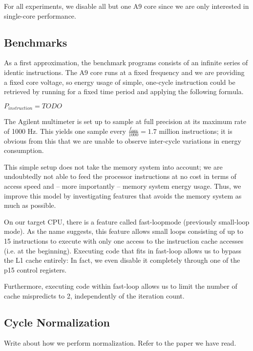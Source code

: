 For all experiments, we disable all but one A9 core since we are only interested
in single-core performance.


\subsection{Benchmarks}
As a first approximation, the benchmark programs consists of an infinite series
of identic instructions. The A9 core runs at a fixed frequency and we are
providing a fixed core voltage, so energy usage of simple, one-cycle instruction
could be retrieved by running for a fixed time period and applying the following
formula.

\begin{center}
$P_{instruction} = TODO$
\end{center}

The Agilent multimeter is set up to sample at full precision at its maximum rate
of 1000 Hz. This yields one sample every $\frac{ f_{core} }{ 1000 } = 1.7$
million instructions; it is obvious from this that we are unable to observe
inter-cycle variations in energy consumption.

This simple setup does not take the memory system into account; we are
undoubtedly not able to feed the processor instructions at no cost in terms of
access speed and -- more importantly -- memory system energy usage. Thus, we
improve this model by investigating features that avoids the memory system as
much as possible.

On our target CPU, there is a feature called fast-loop\texttrademark mode
(previously small-loop mode). As the name suggests, this feature allows small
loops consisting of up to 15 instructions to execute with only one access to the
instruction cache accesses (i.e. at the beginning). Executing code that fits in
fast-loop allows us to bypass the L1 cache entirely: In fact, we even disable it
completely through one of the p15 control registers.

Furthermore, executing code within fast-loop allows us to limit the number of
cache mispredicts to 2, independently of the iteration count.


\subsection{Cycle Normalization}
Write about how we perform normalization. Refer to the paper we have read.
